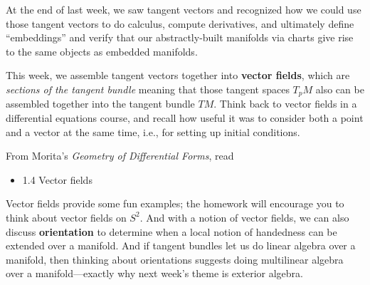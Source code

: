 \documentclass{homework}
\author{Jim Fowler}
\date{Week 3: Vector fields}
\begin{document}
\maketitle

At the end of last week, we saw tangent vectors and recognized how we
could use those tangent vectors to do calculus, compute derivatives,
and ultimately define ``embeddings'' and verify that our
abstractly-built manifolds via charts give rise to the same objects as
embedded manifolds.

This week, we assemble tangent vectors together into \textbf{vector
  fields}, which are \textit{sections of the tangent bundle} meaning
that those tangent spaces $T_p M$ also can be assembled together into
the tangent bundle $TM$.  Think back to vector fields in a
differential equations course, and recall how useful it was to
consider both a point and a vector at the same time, i.e., for setting
up initial conditions.

From Morita's \textit{Geometry of Differential Forms}, read
\begin{itemize}
\item 1.4 Vector fields
\end{itemize}
Vector fields provide some fun examples; the homework will encourage
you to think about vector fields on $S^2$.  And with a notion of
vector fields, we can also discuss \textbf{orientation} to determine
when a local notion of handedness can be extended over a manifold.
And if tangent bundles let us do linear algebra over a manifold, then
thinking about orientations suggests doing multilinear algebra over a
manifold---exactly why next week's theme is exterior algebra.
\end{document}
